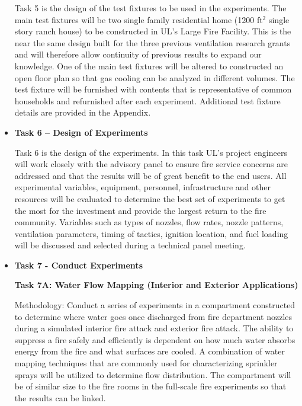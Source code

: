 \documentclass{article}
\begin{document}
\begin{itemize}
Task 5 is the design of the test fixtures to be used in the experiments. The main test fixtures will be two single family residential home (1200 ft$^2$ single story ranch house) to be constructed in UL’s Large Fire Facility. This is the near the same design built for the three previous ventilation research grants and will therefore allow continuity of previous results to expand our knowledge. One of the main test fixtures will be altered to constructed an open floor plan so that gas cooling can be analyzed in different volumes. The test fixture will be furnished with contents that is representative of common households and refurnished after each experiment. Additional test fixture details are provided in the Appendix.
\vspace*{\baselineskip}

\clearpage

\item \bf{Task 6 – Design of Experiments}
\normalfont
\vspace*{\baselineskip}

Task 6 is the design of the experiments. In this task UL’s project engineers will work closely with the advisory panel to ensure fire service concerns are addressed and that the results will be of great benefit to the end users. All experimental variables, equipment, personnel, infrastructure and other resources will be evaluated to determine the best set of experiments to get the most for the investment and provide the largest return to the fire community. Variables such as types of nozzles, flow rates, nozzle patterns, ventilation parameters, timing of tactics, ignition location, and fuel loading will be discussed and selected during a technical panel meeting.  
\vspace*{\baselineskip}

\item \bf{Task 7 - Conduct Experiments}
\normalfont
\vspace*{\baselineskip}

\subitem \bf{Task 7A:  Water Flow Mapping (Interior and Exterior Applications)}
\normalfont
\vspace*{\baselineskip} 

Methodology: Conduct a series of experiments in a compartment constructed to determine where water goes once discharged from fire department nozzles during a simulated interior fire attack and exterior fire attack. The ability to suppress a fire safely and efficiently is dependent on how much water absorbs energy from the fire and what surfaces are cooled. A combination of water mapping techniques that are commonly used for characterizing sprinkler sprays will be utilized to determine flow distribution. The compartment will be of similar size to the fire rooms in the full-scale fire experiments so that the results can be linked.


\end{itemize}
\end{document}
